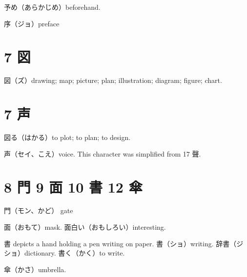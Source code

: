 予め（あらかじめ）beforehand.

序（ジョ）preface

\section{7 図}

図（ズ）drawing; map; picture; plan; illustration; diagram; figure; chart.

\section{7 声}

図る（はかる）to plot; to plan; to design.

声（セイ、こえ）voice.
This character was simplified from 17 聲.

\section{8 門 9 面 10 書 12 傘}

門（モン、かど） gate

面（おもて）mask.
面白い（おもしろい）interesting.

書 depicts a hand holding a pen writing on paper.
書（ショ）writing.
辞書（ジショ）dictionary.
書く（かく）to write.

傘（かさ）umbrella.
